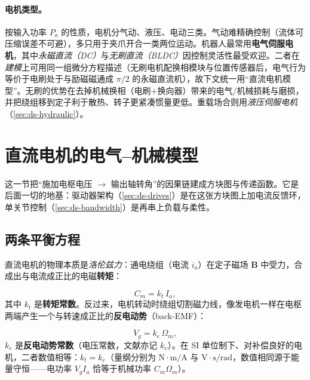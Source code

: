 \paragraph{电机类型。}\;按输入功率 $P_a$ 的性质，电机分气动、液压、电动三类。气动难精确控制（流体可压缩误差不可避），多只用于夹爪开合一类两位运动。机器人最常用\textbf{电气伺服电机}，其中\emph{永磁直流（DC）}与\emph{无刷直流（BLDC）}因控制灵活性最受欢迎。二者在\emph{建模}上可用同一组微分方程描述（无刷电机配换相模块与位置传感器后，电气行为等价于电刷处于与励磁磁通成 $\pi/2$ 的永磁直流机），故下文统一用“直流电机模型”。无刷的优势在去掉机械换相（电刷$+$换向器）带来的电气/机械损耗与磨损，并把绕组移到定子利于散热、转子更紧凑惯量更低。重载场合则用\emph{液压伺服电机}（\cref{sec:ds-hydraulic}）。

\section{直流电机的电气--机械模型}
\label{sec:ds-dcmotor}

这一节把“施加电枢电压 $\to$ 输出轴转角”的因果链建成方块图与传递函数。它是后面一切的地基：驱动器架构（\cref{sec:ds-drives}）是在这张方块图上加电流反馈环，单关节控制（\cref{sec:ds-bandwidth}）是再串上负载与柔性。

\subsection{两条平衡方程}
\label{sec:ds-balances}

直流电机的物理本质是\emph{洛伦兹力}：通电绕组（电流 $i_a$）在定子磁场 $\mathbf{B}$ 中受力，合成出与电流成正比的电磁\textbf{转矩}\cite{craig2005introduction}：

\begin{equation}
C_m = k_t\,I_a,
\label{eq:ds-torque}
\end{equation}
其中 $k_t$ 是\textbf{转矩常数}。反过来，电机转动时绕组切割磁力线，像发电机一样在电枢两端产生一个与转速成正比的\textbf{反电动势}（back-EMF）：

\begin{equation}
V_g = k_e\,\Omega_m,
\label{eq:ds-backemf}
\end{equation}
$k_e$ 是\textbf{反电动势常数}（电压常数，文献亦记 $k_v$）。在 SI 单位制下、对补偿良好的电机，二者数值相等：$k_t=k_e$（量纲分别为 $\mathrm{N\cdot m/A}$ 与 $\mathrm{V\cdot s/rad}$，数值相同源于能量守恒——电功率 $V_g I_a$ 恰等于机械功率 $C_m\Omega_m$）。


